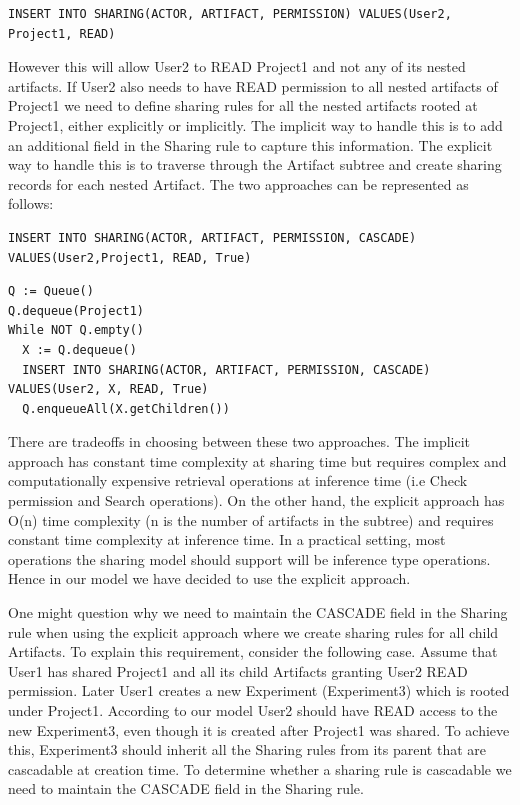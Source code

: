 \documentclass[sigconf]{acmart}
\begin{document}
\begin{lstlisting} 
INSERT INTO SHARING(ACTOR, ARTIFACT, PERMISSION) VALUES(User2, Project1, READ)
\end{lstlisting}

However this will allow User2 to READ Project1 and not any of its nested artifacts. If User2 also needs to have READ permission to all nested artifacts of Project1 we need to define sharing rules for all the nested artifacts rooted at Project1, either explicitly or implicitly. The implicit way to handle this is to add an additional field in the Sharing rule to capture this information. The explicit way to handle this is to traverse through the Artifact subtree and create sharing records for each nested Artifact. The two approaches can be represented as follows:

\begin{lstlisting} 
INSERT INTO SHARING(ACTOR, ARTIFACT, PERMISSION, CASCADE) VALUES(User2,Project1, READ, True)
\end{lstlisting}

\begin{lstlisting} 
Q := Queue()
Q.dequeue(Project1)
While NOT Q.empty()
  X := Q.dequeue()
  INSERT INTO SHARING(ACTOR, ARTIFACT, PERMISSION, CASCADE) VALUES(User2, X, READ, True)
  Q.enqueueAll(X.getChildren())
\end{lstlisting}

There are tradeoffs in choosing between these two approaches. The implicit approach has constant time complexity at sharing time but requires complex and computationally expensive retrieval operations at inference time (i.e Check permission and Search operations). On the other hand, the explicit approach has O(n) time complexity (n is the number of artifacts in the subtree) and requires constant time complexity at inference time. In a practical setting, most operations the sharing model should support will be inference type operations. Hence in our model we have decided to use the explicit approach.

One might question why we need to maintain the CASCADE field in the Sharing rule when using the explicit approach where we create sharing rules for all child Artifacts. To explain this requirement, consider the following case. Assume that User1 has shared Project1 and all its child Artifacts granting  User2 READ permission. Later User1 creates a new Experiment (Experiment3) which is rooted under Project1. According to our model User2 should have READ access to the new Experiment3, even though it is created after Project1 was shared. To achieve this, Experiment3 should inherit all the Sharing rules from its parent that  are cascadable at creation time. To determine whether a sharing rule is cascadable we need to maintain the CASCADE field in the Sharing rule.
\end{document}
